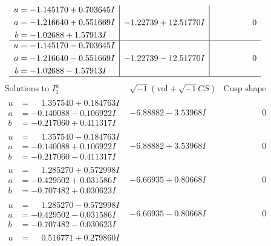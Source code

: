 \documentclass[1p]{elsarticle_modified}
\theoremstyle{definition}
\newcommand{\I}{\sqrt{-1}}
\begin{document}
$$\begin{array}{c|c|c}
\begin{aligned}
u &= -1.145170 + 0.703645 I \\
a &= -1.216640 + 0.551669 I \\
b &= -1.02688 + 1.57913 I\end{aligned}
 & -1.22739 + 12.51770 I & \phantom{-0.000000 } 0 \\ \hline\begin{aligned}
u &= -1.145170 - 0.703645 I \\
a &= -1.216640 - 0.551669 I \\
b &= -1.02688 - 1.57913 I\end{aligned}
 & -1.22739 - 12.51770 I & \phantom{-0.000000 } 0\\
 \hline 
 \end{array}$$\newpage$$\begin{array}{c|c|c}  
\text{Solutions to }I^u_{1}& \I (\text{vol} + \sqrt{-1}CS) & \text{Cusp shape}\\
 \hline 
\begin{aligned}
u &= \phantom{-}1.357540 + 0.184763 I \\
a &= -0.140088 - 0.106922 I \\
b &= -0.217060 + 0.411317 I\end{aligned}
 & -6.88882 - 3.53968 I & \phantom{-0.000000 } 0 \\ \hline\begin{aligned}
u &= \phantom{-}1.357540 - 0.184763 I \\
a &= -0.140088 + 0.106922 I \\
b &= -0.217060 - 0.411317 I\end{aligned}
 & -6.88882 + 3.53968 I & \phantom{-0.000000 } 0 \\ \hline\begin{aligned}
u &= \phantom{-}1.285270 + 0.572998 I \\
a &= -0.429502 + 0.031586 I \\
b &= -0.707482 + 0.030623 I\end{aligned}
 & -6.66935 + 0.80668 I & \phantom{-0.000000 } 0 \\ \hline\begin{aligned}
u &= \phantom{-}1.285270 - 0.572998 I \\
a &= -0.429502 - 0.031586 I \\
b &= -0.707482 - 0.030623 I\end{aligned}
 & -6.66935 - 0.80668 I & \phantom{-0.000000 } 0 \\ \hline\begin{aligned}
u &= \phantom{-}0.516771 + 0.279860 I \\

\end{aligned}
\end{array}$$
\end{document}
